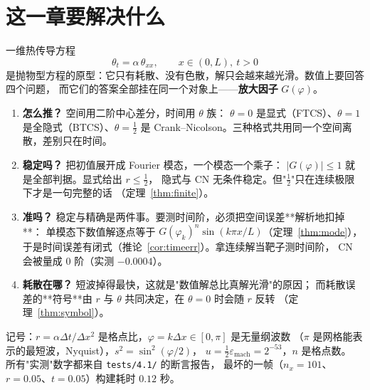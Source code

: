 

\section{这一章要解决什么}

一维热传导方程
\begin{equation}
  \theta_t=\alpha\,\theta_{xx},\qquad x\in(0,L),\ t>0
  \label{eq:heat}
\end{equation}
是抛物型方程的原型：它只有耗散、没有色散，解只会越来越光滑。数值上要回答四个问题，
而它们的答案全部挂在同一个对象上——\textbf{放大因子} $G(\varphi)$。

\begin{enumerate}
  \item \textbf{怎么推？} 空间用二阶中心差分，时间用 $\theta$ 族：
        $\theta=0$ 是显式（FTCS）、$\theta=1$ 是全隐式（BTCS）、$\theta=\frac12$ 是
        Crank--Nicolson。三种格式共用同一个空间离散，差别只在时间。
  \item \textbf{稳定吗？} 把初值展开成 Fourier 模态，一个模态一个乘子：
        $|G(\varphi)|\le1$ 就是全部判据。显式给出 $r\le\frac12$，
        隐式与 CN 无条件稳定。但"$\frac12$"只在连续极限下才是一句完整的话
        （定理~\ref{thm:finite}）。
  \item \textbf{准吗？} 稳定与精确是两件事。要测时间阶，必须把空间误差**解析地扣掉**：
        单模态下数值解逐点等于 $G(\varphi_k)^n\sin(k\pi x/L)$（定理~\ref{thm:mode}），
        于是时间误差有闭式（推论~\ref{cor:timeerr}）。拿连续解当靶子测时间阶，
        CN 会被量成 $0$ 阶（实测 $-0.0004$）。
  \item \textbf{耗散在哪？} 短波掉得最快，这就是"数值解总比真解光滑"的原因；
        而耗散误差的**符号**由 $r$ 与 $\theta$ 共同决定，在 $\theta=0$ 时会随 $r$ 反转
        （定理~\ref{thm:symbol}）。
\end{enumerate}

记号：$r=\alpha\Delta t/\Delta x^2$ 是格点比，$\varphi=k\Delta x\in[0,\pi]$ 是无量纲波数
（$\pi$ 是网格能表示的最短波，Nyquist），$s^2=\sin^2(\varphi/2)$，
$u=\frac12\varepsilon_{\text{mach}}=2^{-53}$，$n$ 是格点数。
所有"实测"数字都来自 \texttt{tests/4.1/} 的断言报告，
最坏的一帧（$n_x=101$、$r=0.05$、$t=0.05$）构建耗时 $0.12$ 秒。

